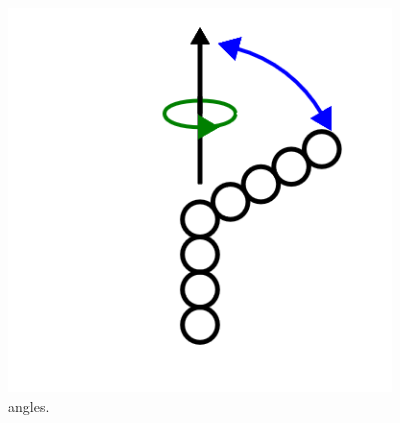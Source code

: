 \begin{figure}
	\centering
	\includegraphics[width=4in]{figures/geometron3d/angles.png}
	\caption[angles]
	{angles.}
\end{figure}

